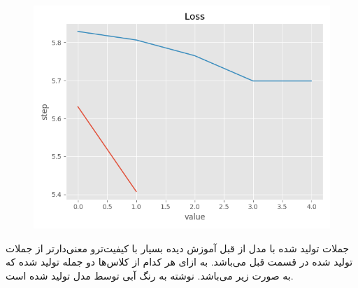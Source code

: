 \documentclass[10pt]{article}
\begin{document}
		\begin{figure}[H]
		\centering\includegraphics[width=\linewidth]{../reports/loss_history_GPT2_happiness.png}
		\caption{ 
			}
		\label{GPT_hap}
	\end{figure}


جملات تولید شده با مدل از قبل آموزش دیده
بسیار با کیفیت‌ترو معنی‌دارتر از جملات تولید شده در قسمت قبل می‌باشد.
به ازای هر کدام از کلاس‌ها دو جمله تولید شده که به صورت زیر می‌باشد. نوشته به رنگ آبی توسط مدل تولید شده است.
\end{document}
